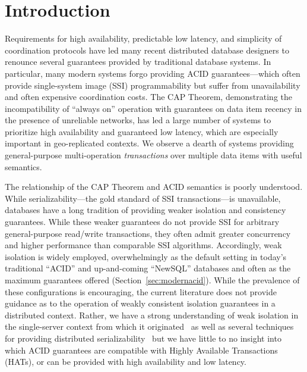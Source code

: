 

\section{Introduction}

Requirements for high availability, predictable low latency, and
simplicity of coordination protocols have led many recent distributed
database designers to renounce several guarantees provided by
traditional database systems. In particular, many modern systems forgo
providing ACID guarantees---which often provide single-system image
(SSI) programmability but suffer from unavailability and often
expensive coordination costs. The CAP Theorem, demonstrating the
incompatibility of ``always on'' operation with guarantees on data
item recency in the presence of unreliable networks, has led a large
number of systems to prioritize high availability and guaranteed low
latency, which are especially important in geo-replicated contexts. We
observe a dearth of systems providing general-purpose multi-operation
\textit{transactions} over multiple data items with useful semantics.

The relationship of the CAP Theorem and ACID semantics is poorly
understood. While serializability---the gold standard of SSI
transactions---is unavailable, databases have a long tradition of
providing weaker isolation and consistency guarantees. While these
weaker guarantees do not provide SSI for arbitrary general-purpose
read/write transactions, they often admit greater concurrency and
higher performance than comparable SSI algorithms. Accordingly, weak
isolation is widely employed, overwhelmingly as the default setting in
today's traditional ``ACID'' and up-and-coming ``NewSQL'' databases
and often as the maximum guarantees offered
(Section~\ref{sec:modernacid}). While the prevalence of these
configurations is encouraging, the current literature does not provide
guidance as to the operation of weakly consistent isolation guarantees
in a distributed context. Rather, we have a strong understanding of
weak isolation in the single-server context from which it
originated~\cite{adya, ansicritique, gray-isolation} as well as
several techniques for providing distributed
serializability~\cite{bernstein-concurrency} but we have little to no
insight into which ACID guarantees are compatible with Highly
Available Transactions (HATs), or can be provided with high
availability and low latency.

